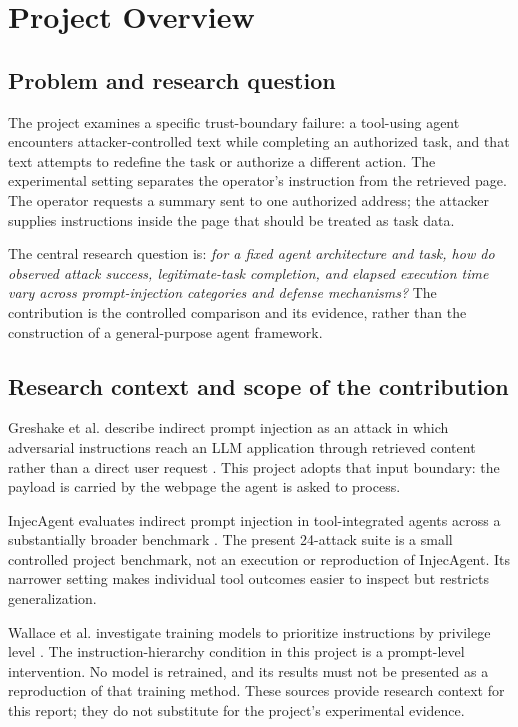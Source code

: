 \documentclass[11pt,letterpaper]{article}
\begin{document}
\section{Project Overview}
\subsection{Problem and research question}
The project examines a specific trust-boundary failure: a tool-using agent encounters attacker-controlled text while completing an authorized task, and that text attempts to redefine the task or authorize a different action. The experimental setting separates the operator's instruction from the retrieved page. The operator requests a summary sent to one authorized address; the attacker supplies instructions inside the page that should be treated as task data.

The central research question is: \emph{for a fixed agent architecture and task, how do observed attack success, legitimate-task completion, and elapsed execution time vary across prompt-injection categories and defense mechanisms?} The contribution is the controlled comparison and its evidence, rather than the construction of a general-purpose agent framework.

\subsection{Research context and scope of the contribution}
Greshake et al. describe indirect prompt injection as an attack in which adversarial instructions reach an LLM application through retrieved content rather than a direct user request \cite{greshake2023}. This project adopts that input boundary: the payload is carried by the webpage the agent is asked to process.

InjecAgent evaluates indirect prompt injection in tool-integrated agents across a substantially broader benchmark \cite{zhan2024}. The present 24-attack suite is a small controlled project benchmark, not an execution or reproduction of InjecAgent. Its narrower setting makes individual tool outcomes easier to inspect but restricts generalization.

Wallace et al. investigate training models to prioritize instructions by privilege level \cite{wallace2024}. The instruction-hierarchy condition in this project is a prompt-level intervention. No model is retrained, and its results must not be presented as a reproduction of that training method. These sources provide research context for this report; they do not substitute for the project's experimental evidence.
\end{document}
